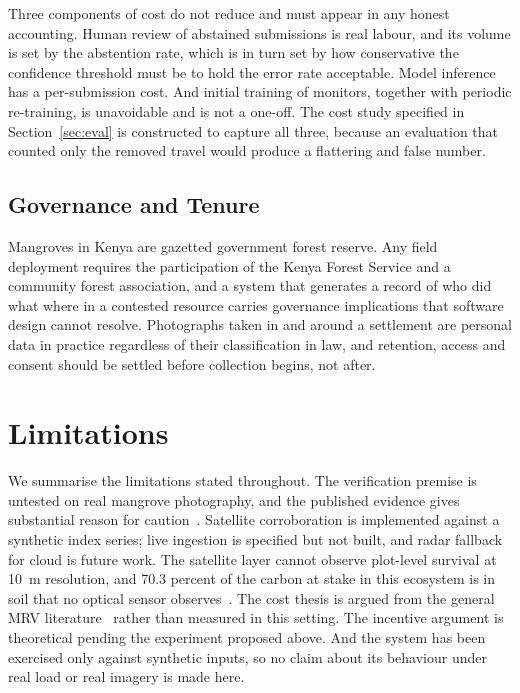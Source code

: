 \documentclass[10pt,twocolumn,a4paper]{article}
\begin{document}
Three components of cost do not reduce and must appear in any honest accounting.
Human review of abstained submissions is real labour, and its volume is set by
the abstention rate, which is in turn set by how conservative the confidence
threshold must be to hold the error rate acceptable. Model inference has a
per-submission cost. And initial training of monitors, together with periodic
re-training, is unavoidable and is not a one-off. The cost study specified in
Section~\ref{sec:eval} is constructed to capture all three, because an
evaluation that counted only the removed travel would produce a flattering and
false number.

\subsection{Governance and Tenure}

Mangroves in Kenya are gazetted government forest reserve. Any field deployment
requires the participation of the Kenya Forest Service and a community forest
association, and a system that generates a record of who did what where in a
contested resource carries governance implications that software design cannot
resolve. Photographs taken in and around a settlement are personal data in
practice regardless of their classification in law, and retention, access and
consent should be settled before collection begins, not after.

\section{Limitations}

We summarise the limitations stated throughout. The verification premise is
untested on real mangrove photography, and the published evidence gives
substantial reason for caution~\cite{zhou2026}. Satellite corroboration is
implemented against a synthetic index series; live ingestion is specified but
not built, and radar fallback for cloud is future work. The satellite layer
cannot observe plot-level survival at 10~m resolution, and 70.3 percent of the
carbon at stake in this ecosystem is in soil that no optical sensor
observes~\cite{kairo2021}. The cost thesis is argued from the general MRV
literature~\cite{vanderheyden2026} rather than measured in this setting. The
incentive argument is theoretical pending the experiment proposed above. And the
system has been exercised only against synthetic inputs, so no claim about its
behaviour under real load or real imagery is made here.
\end{document}
